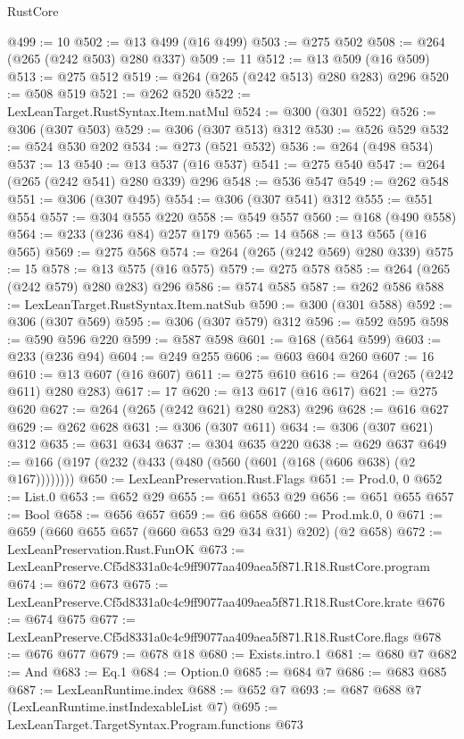 \begin{lexlean}{RustCore}
\begin{coremodule}
@499 := 10
@502 := @13 @499 (@16 @499)
@503 := @275 @502
@508 := @264 (@265 (@242 @503) @280 @337)
@509 := 11
@512 := @13 @509 (@16 @509)
@513 := @275 @512
@519 := @264 (@265 (@242 @513) @280 @283) @296
@520 := @508 @519
@521 := @262 @520
@522 := LexLeanTarget.RustSyntax.Item.natMul
@524 := @300 (@301 @522)
@526 := @306 (@307 @503)
@529 := @306 (@307 @513) @312
@530 := @526 @529
@532 := @524 @530 @202
@534 := @273 (@521 @532)
@536 := @264 (@498 @534)
@537 := 13
@540 := @13 @537 (@16 @537)
@541 := @275 @540
@547 := @264 (@265 (@242 @541) @280 @339) @296
@548 := @536 @547
@549 := @262 @548
@551 := @306 (@307 @495)
@554 := @306 (@307 @541) @312
@555 := @551 @554
@557 := @304 @555 @220
@558 := @549 @557
@560 := @168 (@490 @558)
@564 := @233 (@236 @84) @257 @179
@565 := 14
@568 := @13 @565 (@16 @565)
@569 := @275 @568
@574 := @264 (@265 (@242 @569) @280 @339)
@575 := 15
@578 := @13 @575 (@16 @575)
@579 := @275 @578
@585 := @264 (@265 (@242 @579) @280 @283) @296
@586 := @574 @585
@587 := @262 @586
@588 := LexLeanTarget.RustSyntax.Item.natSub
@590 := @300 (@301 @588)
@592 := @306 (@307 @569)
@595 := @306 (@307 @579) @312
@596 := @592 @595
@598 := @590 @596 @220
@599 := @587 @598
@601 := @168 (@564 @599)
@603 := @233 (@236 @94)
@604 := @249 @255
@606 := @603 @604 @260
@607 := 16
@610 := @13 @607 (@16 @607)
@611 := @275 @610
@616 := @264 (@265 (@242 @611) @280 @283)
@617 := 17
@620 := @13 @617 (@16 @617)
@621 := @275 @620
@627 := @264 (@265 (@242 @621) @280 @283) @296
@628 := @616 @627
@629 := @262 @628
@631 := @306 (@307 @611)
@634 := @306 (@307 @621) @312
@635 := @631 @634
@637 := @304 @635 @220
@638 := @629 @637
@649 := @166 (@197 (@232 (@433 (@480 (@560 (@601 (@168 (@606 @638) (@2 @167))))))))
@650 := LexLeanPreservation.Rust.Flags
@651 := Prod.{0, 0}
@652 := List.{0}
@653 := @652 @29
@655 := @651 @653 @29
@656 := @651 @655
@657 := Bool
@658 := @656 @657
@659 := @6 @658
@660 := Prod.mk.{0, 0}
@671 := @659 (@660 @655 @657 (@660 @653 @29 @34 @31) @202) (@2 @658)
@672 := LexLeanPreservation.Rust.FunOK
@673 := LexLeanPreserve.Cf5d8331a0c4c9ff9077aa409aea5f871.R18.RustCore.program
@674 := @672 @673
@675 := LexLeanPreserve.Cf5d8331a0c4c9ff9077aa409aea5f871.R18.RustCore.krate
@676 := @674 @675
@677 := LexLeanPreserve.Cf5d8331a0c4c9ff9077aa409aea5f871.R18.RustCore.flags
@678 := @676 @677
@679 := @678 @18
@680 := Exists.intro.{1}
@681 := @680 @7
@682 := And
@683 := Eq.{1}
@684 := Option.{0}
@685 := @684 @7
@686 := @683 @685
@687 := LexLeanRuntime.index
@688 := @652 @7
@693 := @687 @688 @7 (LexLeanRuntime.instIndexableList @7)
@695 := LexLeanTarget.TargetSyntax.Program.functions @673

\end{coremodule}
\end{lexlean}
